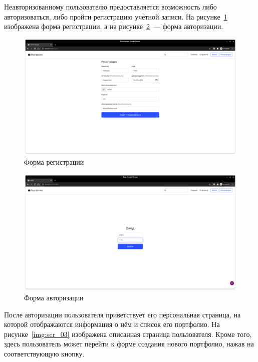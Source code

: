 Неавторизованному пользователю предоставляется возможность либо авторизоваться, либо пройти регистрацию учётной записи. На рисунке~\ref{img:scr_01} изображена форма регистрации, а на рисунке~\ref{img:scr_02}~--- форма авторизации.

\begin{figure}[H]
    \centering
    \includegraphics[scale=0.235]{images/scr_01.png}
    \caption{Форма регистрации}\label{img:scr_01}
\end{figure}

\begin{figure}[H]
    \centering
    \includegraphics[scale=0.235]{images/scr_02.png}
    \caption{Форма авторизации}\label{img:scr_02}
\end{figure}

После авторизации пользователя приветствует его персональная страница, на которой отображаются информация о нём и список его портфолио. На рисунке~\ref{img:scr_03} изображена описанная страница пользователя. Кроме того, здесь пользователь может перейти к форме создания нового портфолио, нажав на соответствующую кнопку.

